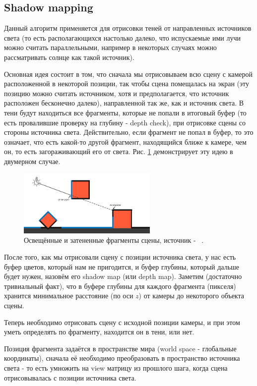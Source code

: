 \documentclass[14pt]{extarticle}
\begin{document}
\subsection{Shadow mapping}
Данный алгоритм применяется для отрисовки теней от направленных источников света (то есть располагающихся настолько далеко, что испускаемые ими лучи можно считать параллельными, например в некоторых случаях можно рассматривать солнце как такой источник).

Основная идея состоит в том, что сначала мы отрисовываем всю сцену с камерой расположенной в некоторой позиции, так чтобы сцена помещалась на экран (эту позицию можно считать источником, хотя и предполагается, что источник расположен бесконечно далеко), направленной так же, как и источник света. В тени будут находиться все фрагменты, которые не попали в итоговый буфер (то есть провалившие проверку на глубину - depth check), при отрисовке сцены со стороны источника света. Действительно, если фрагмент не попал в буфер, то это означает, что есть какой-то другой фрагмент, находящийся ближе к камере, чем он, то есть загораживающий его от света. Рис. \ref{fig:shadow1} демонстрирует эту идею в двумерном случае.

\begin{figure}
	\label{fig:shadow1}
	\caption{Освещённые и затененные фрагменты сцены, источник - ~\cite{shadow1}.}
	\includegraphics[width=0.6\textwidth]{shadowmapping1.png}
\end{figure}

После того, как мы отрисовали сцену с позиции источника света, у нас есть буфер цветов, который нам не пригодится, и буфер глубины, который дальше будет нужен, назовём его shadow map (или depth map). Заметим (достаточно тривиальный факт), что в буфере глубины для каждого фрагмента (пикселя) хранится минимальное расстояние (по оси $z$) от камеры до некоторого объекта сцены.

Теперь необходимо отрисовать сцену с исходной позиции камеры, и при этом уметь определять по фрагменту, находится он в тени, или нет. 

Позиция фрагмента задаётся в пространстве мира (world space - глобальные координаты), сначала её необходимо преобразовать в пространство источника света - то есть умножить на view матрицу из прошлого шага, когда сцена отрисовывалась с позиции источника света. 
\end{document}
